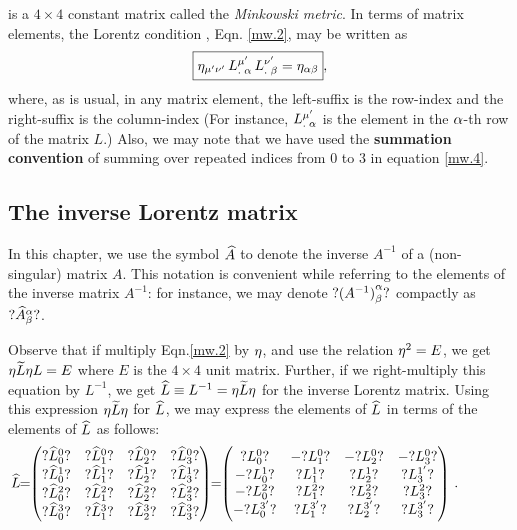 is a $4\times 4$ constant  matrix called the 
\textsl{Minkowski metric}. In terms 
of matrix elements, the Lorentz condition \ie, Eqn. 
\eqref{mw.2}, may be written as
\begin{align}\label{mw.4}
\boxed{{\eta}_{{\mu'}{\nu'}}\,{{L}^{{\mu'}}_{.\;{\alpha}}}
\,{{L}^{{\nu'}}_{.\;{\beta}}} 
={\eta}_{{\alpha}{\beta}}},
\end{align}
where, as is usual, in any matrix element, the 
left-suffix is  the row-index and the right-suffix is  
the column-index (For instance, 
${{L}^{{\mu'}}_{.\;{\alpha}}}$ is the element in the 
${\alpha}$-th row of the matrix $L$.) Also, we may note 
that we have used the \textbf{summation convention} of 
summing over  repeated indices from $0$ to $3$ in 
equation \eqref{mw.4}. \subsection{The inverse Lorentz 
matrix}  In this chapter, we use the 
symbol ${{\widehat{A}}}$ to denote the inverse $A^{-1}$ of 
a (non-singular) matrix $A$. This notation is 
convenient while referring to the elements of the 
inverse matrix $A^{-1}$: for instance, we may 
denote $?{(A^{-1})}^{{\alpha}}_{{\beta}}?$ 
compactly as $?{{\widehat{A}}}^{{\alpha}}_{{\beta}}?$.

 Observe that if 
multiply Eqn.\eqref{mw.2} by ${\eta}$, and use the 
relation ${\eta}^2=E$, we get ${\eta} \widetilde{L} {\eta} L=E$  
where $E$ is the $4\times 4$ unit matrix. Further, if 
we right-multiply this equation by $ L^{-1}$, we get 
${{\widehat{L}}}\equiv L^{-1} ={\eta} \widetilde{L} {\eta}$ for the 
inverse Lorentz matrix. Using this expression ${\eta} 
\widetilde{L} {\eta}$ for ${{\widehat{L}}}$, we may express the 
elements of ${{\widehat{L}}}$ in terms of  the elements of  
${{\widehat{L}}}$ as follows:\vspace{.5\bsk}
\begin{align}\label{mw.5}
&\hspace*{-9mm}\what{L}\nnt= \nnt\begin{pmatrix}
?{\what{L}}^{0}_{0}? &?{\what{L}}^{0}_{1}?&
?{\what{L}}^{0}_{2}? &?{\what{L}}^{0}_{3}?\\
?{\what{L}}^{1}_{0}? &?{\what{L}}^{1}_{1}?&
?{\what{L}}^{1}_{2}? &?{\what{L}}^{1}_{3}?\\
?{\what{L}}^{2}_{0}? &?{\what{L}}^{2}_{1}?&
?{\what{L}}^{2}_{2}? &?{\what{L}}^{2}_{3}?\\
?{\what{L}}^{3}_{0}? &?{\what{L}}^{3}_{1}?&
?{\what{L}}^{3}_{2}? &?{\what{L}}^{3}_{3}?\\
\end{pmatrix} \nnt= \nnt
\begin{pmatrix}
 ?L^{0}_0?& -?L^{0}_1?& -?L^{0}_2? & -?L^{0}_3?\\
-?L^{1}_0?&  ?L^{1}_1?&  ?L^{1}_2? &  ?L^{1'}_3?\\
-?L^{2}_0?&  ?L^{2}_1?&  ?L^{2}_2? & ?L^{2}_3?\\
-?L^{3'}_0?&  ?L^{3'}_1?&  ?L^{3'}_2? & ?L^{3'}_3?\\
\end{pmatrix}\,.
\end{align}

